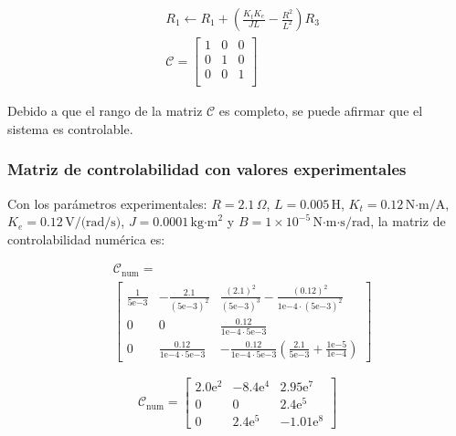 \begin{equation*}
  \begin{aligned}
    &R_1 \leftarrow R_1 + \left(\tfrac{K_t K_e}{JL}-\tfrac{R^2}{L^2}\right) R_3\\
    &\mathcal{C} = 
    \begin{bmatrix}
      1           &   0               &  0                                     \\
      0           &   1               &  0                                     \\
      0           &   0               &  1                                     \\
    \end{bmatrix}
  \end{aligned}
\end{equation*}

Debido a que el rango de la matriz $\mathcal{C}$ es completo, se puede afirmar que el sistema es controlable.

\subsubsection{Matriz de controlabilidad con valores experimentales}

Con los parámetros experimentales: $R = 2.1\,\Omega$, $L = 0.005\,\text{H}$,
$K_t = 0.12\,\text{N·m/A}$, $K_e = 0.12\,\text{V/(rad/s)}$, $J = 0.0001\,\text{kg·m}^2$
y $B = 1\times10^{-5}\,\text{N·m·s/rad}$, la matriz de controlabilidad numérica es:

\begin{equation*}
  \begin{aligned}
    &\mathcal{C}_{\text{num}} = \\
    &\begin{bmatrix}
      \tfrac{1}{5\mathrm{e}{-3}} & -\tfrac{2.1}{(5\mathrm{e}{-3})^2} & \tfrac{(2.1)^2}{(5\mathrm{e}{-3})^3} - \tfrac{(0.12)^2}{1\mathrm{e}{-4} \cdot (5\mathrm{e}{-3})^2} \\[2pt]
      0 & 0 & \tfrac{0.12}{1\mathrm{e}{-4} \cdot 5\mathrm{e}{-3}} \\[2pt]
      0 & \tfrac{0.12}{1\mathrm{e}{-4} \cdot 5\mathrm{e}{-3}} & -\tfrac{0.12}{1\mathrm{e}{-4} \cdot 5\mathrm{e}{-3}}\left( \tfrac{2.1}{5\mathrm{e}{-3}} + \tfrac{1\mathrm{e}{-5}}{1\mathrm{e}{-4}} \right)
    \end{bmatrix}
  \end{aligned}
\end{equation*}

\begin{equation}
\mathcal{C}_{\text{num}} = 
\begin{bmatrix}
    2.0\mathrm{e}^{2} & -8.4\mathrm{e}^{4} & 2.95\mathrm{e}^{7} \\[2pt]
    0 & 0 & 2.4\mathrm{e}^{5} \\[2pt]
    0 & 2.4\mathrm{e}^{5} & -1.01\mathrm{e}^{8}
\end{bmatrix}
\label{eq:MatrizControlabilidadMotorValoresExperimentales}
\end{equation}
